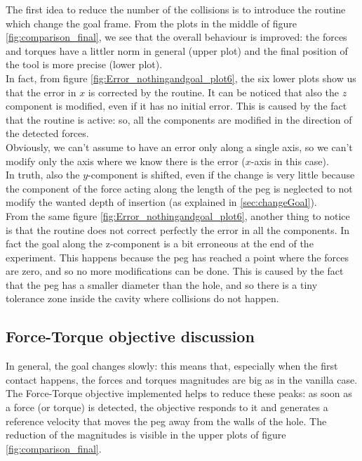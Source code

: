 The first idea to reduce the number of the collisions is to introduce the routine which change the goal frame. From the plots in the middle of figure \ref{fig:comparison_final}, we see that the overall behaviour is improved: the forces and torques have a littler norm in general (upper plot) and the final position of the tool is more precise (lower plot).\\

In fact, from figure \ref{fig:Error_nothingandgoal_plot6}, the six lower plots show us that the error in $x$ is corrected by the routine. It can be noticed that also the $z$ component is modified, even if it has no initial error. This is caused by the fact that the routine is active: so, all the components are modified in the direction of the detected forces.\\
Obviously, we can't assume to have an error only along a single axis, so we can't modify only the axis where we know there is the error ($x$-axis in this case).\\
In truth, also the \mbox{$y$-component} is shifted, even if the change is very little because the component of the force acting along the length of the peg is neglected to not modify the wanted depth of insertion (as explained in \ref{sec:changeGoal}).\\

From the same figure \ref{fig:Error_nothingandgoal_plot6}, another thing to notice is that the routine does not correct perfectly the error in all the components. In fact the goal along the z-component is a bit erroneous at the end of the experiment. This happens because the peg has reached a point where the forces are zero, and so no more modifications can be done. This is caused by the fact that the peg has a smaller diameter than the hole, and so there is a tiny tolerance zone inside the cavity where collisions do not happen.\\

\subsection{Force-Torque objective discussion}
In general, the goal changes slowly: this means that, especially when the first contact happens, the forces and torques magnitudes are big as in the vanilla case.\\
The Force-Torque objective implemented helps to reduce these peaks: as soon as a force (or torque) is detected, the objective responds to it and generates a reference velocity that moves the peg away from the walls of the hole. The reduction of the magnitudes is visible in the upper plots of figure \ref{fig:comparison_final}. \\

